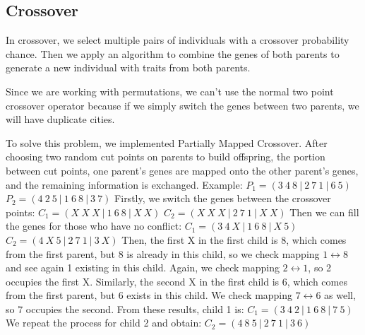 \subsection{Crossover}
In crossover, we select multiple pairs of individuals with a crossover probability chance. Then we apply an algorithm to combine the genes of both parents to generate a new individual with traits from both parents.
\par
Since we are working with permutations, we can't use the normal two point crossover operator because if we simply switch the genes between two parents, we will have duplicate cities.
\par
To solve this problem, we implemented Partially Mapped Crossover. After choosing two random cut points on parents to build offspring, the portion between cut points, one parent’s genes are mapped onto the other parent’s genes, and the remaining information is exchanged.
\newline
Example:
\newline
$P_{1} = (3\:4\:8\:|\:2\:7\:1\:|\:6\:5)$
\newline
$P_{2} = (4\:2\:5\:|\:1\:6\:8\:|\:3\:7)$
\newline
Firstly, we switch the genes between the crossover points:
\newline
$C_{1} = (X\:X\:X\:|\:1\:6\:8\:|\:X\:X)$
\newline
$C_{2} = (X\:X\:X\:|\:2\:7\:1\:|\:X\:X)$
\newline
Then we can fill the genes for those who have no conflict:
\newline
$C_{1} = (3\:4\:X\:|\:1\:6\:8\:|\:X\:5)$
\newline
$C_{2} = (4\:X\:5\:|\:2\:7\:1\:|\:3\:X)$
\newline
Then, the first X in the first child is 8, which comes from the first parent, but 8 is already in this child, so we check mapping $1 \leftrightarrow 8$ and see again 1 existing in this child. Again, we check mapping $2\leftrightarrow 1$, so 2 occupies the first X. Similarly, the second X in the first child is 6, which comes from the first parent, but 6 exists in this child. We check mapping $7 \leftrightarrow 6$ as well, so 7 occupies the second. From these results, child 1 is:
\newline
$C_{1} = (3\:4\:2\:|\:1\:6\:8\:|\:7\:5)$
\newline
We repeat the process for child 2 and obtain:
\newline
$C_{2} = (4\:8\:5\:|\:2\:7\:1\:|\:3\:6)$
\newpage

